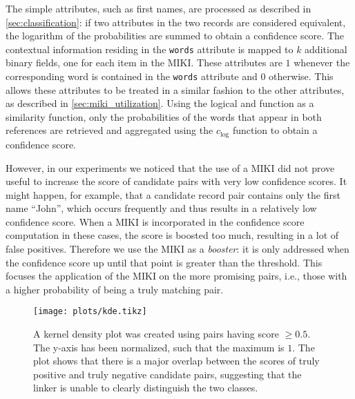 The simple attributes, such as first names, are processed as described in \cref{sec:classification}: if two attributes in the two records are considered equivalent, the logarithm of the probabilities are summed to obtain a confidence score.
The contextual information residing in the \texttt{words} attribute is mapped to $k$ additional binary fields, one for each item in the MIKI.
These attributes are $1$ whenever the corresponding word is contained in the \texttt{words} attribute and $0$ otherwise.
This allows these attributes to be treated in a similar fashion to the other attributes, as described in \cref{sec:miki_utilization}.
Using the logical and function as a similarity function, only the probabilities of the words that appear in both references are retrieved and aggregated using the $c_{\mathrm{log}}$ function to obtain a confidence score.

However, in our experiments we noticed that the use of a MIKI did not prove useful to increase the score of candidate pairs with very low confidence scores.
It might happen, for example, that a candidate record pair contains only the first name ``John'', which occurs frequently and thus results in a relatively low confidence score.
When a MIKI is incorporated in the confidence score computation in these cases, the score is boosted too much, resulting in a lot of false positives.
Therefore we use the MIKI as a \emph{booster}: it is only addressed when the confidence score up until that point is greater than the threshold.
This focuses the application of the MIKI on the more promising pairs, i.e., those with a higher probability of being a truly matching pair.

\begin{figure}
    \centering
    \texttt{[image: plots/kde.tikz]}
    \caption{A kernel density plot was created using pairs having score $\geq 0.5$. The y-axis has been normalized, such that the maximum is $1$. The plot shows that there is a major overlap between the scores of truly positive and truly negative candidate pairs, suggesting that the linker is unable to clearly distinguish the two classes.}
    \label{fig:kde}
\end{figure}


